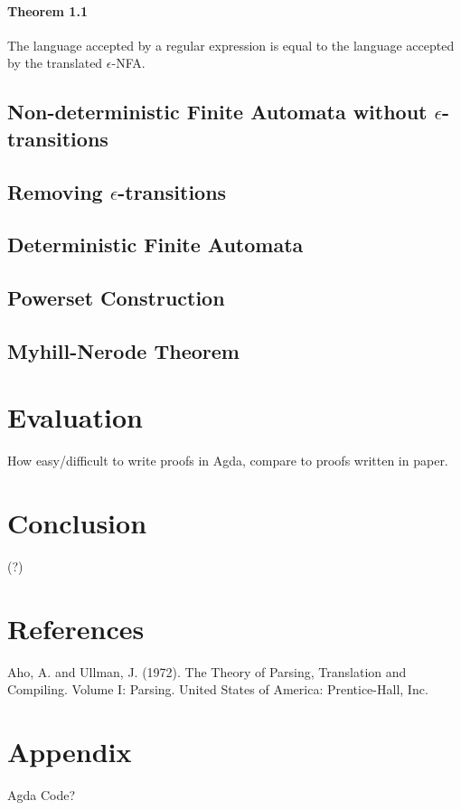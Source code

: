 \documentclass[twoside,openright,final]{bhamthesis}
\begin{document}
\paragraph{Theorem 1.1} The language accepted by a regular expression
is equal to the language accepted by the translated \(\epsilon\)-NFA. 

\subsection{Non-deterministic Finite Automata without \(\epsilon\)-transitions}

\subsection{Removing \(\epsilon\)-transitions}

\subsection{Deterministic Finite Automata}

\subsection{Powerset Construction}

\subsection{Myhill-Nerode Theorem}

\section{Evaluation}
How easy/difficult to write proofs in Agda, compare to proofs written
in paper.

\section{Conclusion}
(?)

\section{References}
Aho, A. and Ullman, J. (1972). The Theory of Parsing, Translation and Compiling. Volume I: Parsing. United States of America: Prentice-Hall, Inc.

\section{Appendix}
Agda Code?
\end{document}
